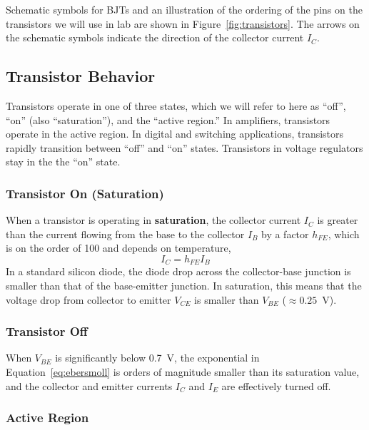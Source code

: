 \documentclass[11pt]{article}
\begin{document}
Schematic symbols for BJTs and an illustration of the ordering of the
pins on the transistors we will use in lab are shown in
Figure~\ref{fig:transistors}. The arrows on the schematic symbols
indicate the direction of the collector current $I_C$.

\subsection{Transistor Behavior}

Transistors operate in one of three states, which we will refer to
here as ``off'', ``on'' (also ``saturation''), and the ``active
region.'' In amplifiers, transistors operate in the active region. In
digital and switching applications, transistors rapidly transition
between ``off'' and ``on'' states. Transistors in voltage regulators
stay in the the ``on'' state.

\subsubsection*{Transistor On (Saturation)}

When a transistor is operating in \textbf{saturation}, the collector
current $I_C$ is greater than the current flowing from the base to the
collector $I_B$ by a factor $h_{FE}$, which is on the order of 100 and
depends on temperature,
\begin{equation}
  I_C = h_{FE} I_B
  \label{eq:hfe}
\end{equation}
In a standard silicon diode, the diode drop across the collector-base
junction is smaller than that of the base-emitter junction. In saturation,
this means that the voltage drop from collector to emitter $V_{CE}$ is
smaller than $V_{BE}$ ($\approx 0.25$~V). 

\subsubsection*{Transistor Off}

When $V_{BE}$ is significantly below 0.7~V, the exponential in
Equation~\ref{eq:ebersmoll} is orders of magnitude smaller than its
saturation value, and the collector and emitter currents $I_C$ and
$I_E$ are effectively turned off. 

\subsubsection*{Active Region}
\end{document}
